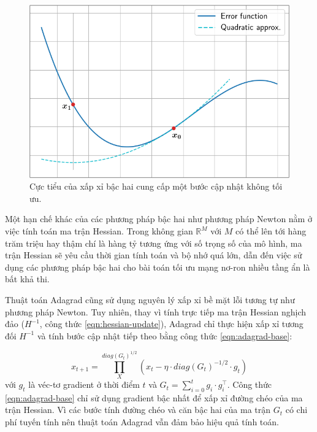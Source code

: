 \begin{figure}
	\centering
	\includegraphics[width=120 mm]{images/hessian-osc.png}
	\caption{Cực tiểu của xấp xỉ bậc hai cung cấp một bước cập nhật không tối ưu.}
	\label{fig:newton-bad-step}
\end{figure}

Một hạn chế khác của các phương pháp bậc hai như phương pháp Newton nằm ở việc tính toán ma trận Hessian. Trong không gian $\mathbb{R}^M$ với $M$ có thể lên tới hàng trăm triệu hay thậm chí là hàng tỷ tương ứng với số trọng số của mô hình, ma trận Hessian sẽ yêu cầu thời gian tính toán và bộ nhớ quá lớn, dẫn đến việc sử dụng các phương pháp bậc hai cho bài toán tối ưu mạng nơ-ron nhiều tầng ẩn là bất khả thi.

Thuật toán Adagrad cũng sử dụng nguyên lý xấp xỉ bề mặt lỗi tương tự như phương pháp Newton. Tuy nhiên, thay vì tính trực tiếp ma trận Hessian nghịch đảo ($H^{-1}$, công thức \ref{eqn:hessian-update}), Adagrad chỉ thực hiện xấp xỉ tương đối $H^{-1}$ và tính bước cập nhật tiếp theo bằng công thức \ref{eqn:adagrad-base}:

\begin{equation}
	\label{eqn:adagrad-base}
	x_{t+1} = \prod^{diag(G_t)^{1/2}}_{X}(x_t-\eta\cdot diag(G_t)^{-1/2}\cdot g_t)
\end{equation}
với $g_t$ là véc-tơ gradient ở thời điểm $t$ và $G_t = \sum^{t}_{i=0}g_i\cdot g^{\top}_i$. Công thức \ref{eqn:adagrad-base} chỉ sử dụng gradient bậc nhất để xấp xỉ đường chéo của ma trận Hessian. Vì các bước tính đường chéo và căn bậc hai của ma trận $G_t$ có chi phí tuyến tính nên thuật toán Adagrad vẫn đảm bảo hiệu quả tính toán.

